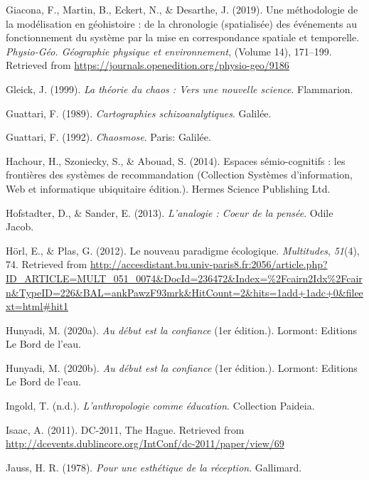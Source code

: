 \documentclass[
  a4paper,
  DIV=11,
  numbers=noendperiod]{scrreprt}
\newlength{\cslhangindent}
\newenvironment{CSLReferences}[2] %
 {\begin{list}{}{%
  \setlength{\itemindent}{0pt}
  \setlength{\leftmargin}{0pt}
  \setlength{\parsep}{0pt}
  \ifodd #1
   \setlength{\leftmargin}{\cslhangindent}
   \setlength{\itemindent}{-1\cslhangindent}
  \fi
  \setlength{\itemsep}{#2\baselineskip}}}
 {\end{list}}
\begin{document}
\begin{CSLReferences}{1}{0}
Giacona, F., Martin, B., Eckert, N., \& Desarthe, J. (2019). Une
méthodologie de la modélisation en géohistoire : de la chronologie
(spatialisée) des événements au fonctionnement du système par la mise en
correspondance spatiale et temporelle. \emph{Physio-Géo. Géographie
physique et environnement}, (Volume 14), 171--199. Retrieved from
\url{https://journals.openedition.org/physio-geo/9186}

Gleick, J. (1999). \emph{La théorie du chaos : Vers une nouvelle
science}. Flammarion.

Guattari, F. (1989). \emph{Cartographies schizoanalytiques}. Galilée.

Guattari, F. (1992). \emph{Chaosmose}. Paris: Galilée.

Hachour, H., Szoniecky, S., \& Abouad, S. (2014). Espaces
sémio-cognitifs : les frontières des systèmes de recommandation
(Collection Systèmes d'information, Web et informatique ubiquitaire
édition.). Hermes Science Publishing Ltd.

Hofstadter, D., \& Sander, E. (2013). \emph{L'analogie : Coeur de la
pensée}. Odile Jacob.

Hörl, E., \& Plas, G. (2012). Le nouveau paradigme écologique.
\emph{Multitudes}, \emph{51}(4), 74. Retrieved from
\url{http://accesdistant.bu.univ-paris8.fr:2056/article.php?ID_ARTICLE=MULT_051_0074&DocId=236472&Index=\%2Fcairn2Idx\%2Fcairn&TypeID=226&BAL=ankPawzF93mrk&HitCount=2&hits=1add+1adc+0&fileext=html\#hit1}

Hunyadi, M. (2020a). \emph{Au début est la confiance} (1er édition.).
Lormont: Editions Le Bord de l'eau.

Hunyadi, M. (2020b). \emph{Au début est la confiance} (1er édition.).
Lormont: Editions Le Bord de l'eau.

Ingold, T. (n.d.). \emph{L'anthropologie comme éducation}. Collection
Paideia.

Isaac, A. (2011). DC-2011, The Hague. Retrieved from
\url{http://dcevents.dublincore.org/IntConf/dc-2011/paper/view/69}

Jauss, H. R. (1978). \emph{Pour une esthétique de la réception}.
Gallimard.


\end{CSLReferences}
\end{document}
